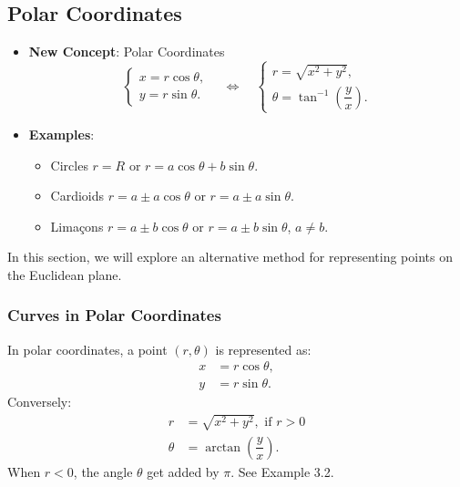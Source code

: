 \subsection{Polar Coordinates} 
\begin{center}
\begin{tcolorbox}
    \begin{itemize}
        \item \textbf{New Concept}: Polar Coordinates 
        \[\begin{cases}
                x = r \cos \theta, \\
                y = r \sin \theta.
            \end{cases} \quad  \iff \quad \begin{cases}
                r = \sqrt{x^2 + y^2},  \\
                \theta = \tan^{-1}\left(\dfrac{y}{x}\right).
            \end{cases}\] 
            \item \textbf{Examples}:
            \begin{itemize}
                \item Circles $r=R$ or $r=a\cos\theta+ b\sin\theta$.
                \item Cardioids $r=a\pm a\cos\theta$ or $r=a\pm a\sin\theta$.
                \item Lima\c{c}ons $r=a\pm b\cos\theta$ or $r=a\pm b\sin\theta$, $a\neq b$.
            \end{itemize}
    \end{itemize}
\end{tcolorbox}
\end{center}


In this section, we will explore an alternative method for representing points on the Euclidean plane.
\subsubsection{Curves in Polar Coordinates}
In polar coordinates, a point $(r, \theta)$ is represented as:
\begin{align*}
    x &= r \cos \theta, \\
    y &= r \sin \theta.
\end{align*}
Conversely:
\begin{align*}
    r &= \sqrt{x^2 + y^2}, \text{ if } r>0 \\
    \theta &= \arctan\left(\dfrac{y}{x}\right).
\end{align*}
When $r<0$, the angle $\theta$ get added by $\pi$. See Example 3.2.

